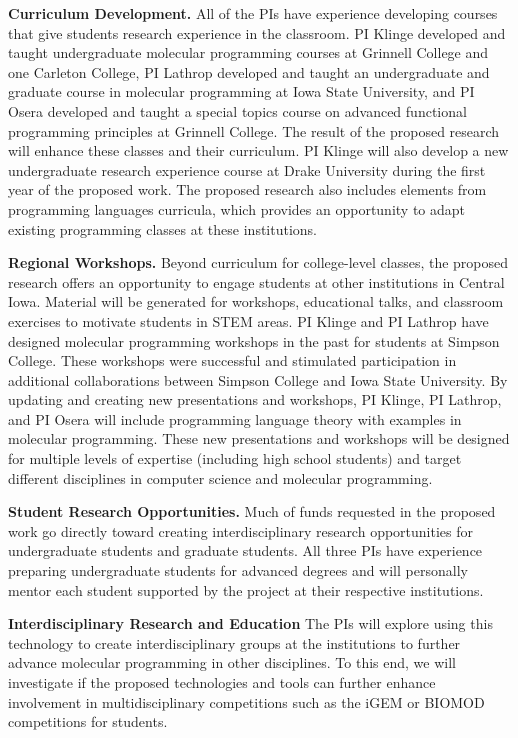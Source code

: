 \textbf{Curriculum Development.}
All of the PIs have experience developing courses that give students research experience in the classroom.
PI Klinge developed and taught undergraduate molecular programming courses at Grinnell College and one Carleton College, PI Lathrop developed and taught an undergraduate and graduate course in molecular programming at Iowa State University, and PI Osera developed and taught a special topics course on advanced functional programming principles at Grinnell College.
The result of the proposed research will enhance these classes and their curriculum.
PI Klinge will also develop a new undergraduate research experience course at Drake University during the first year of the proposed work.
The proposed research also includes elements from programming languages curricula, which provides an opportunity to adapt existing programming classes at these institutions.

\textbf{Regional Workshops.}
Beyond curriculum for college-level classes, the proposed research offers an opportunity to engage students at other institutions in Central Iowa.
Material will be generated for workshops, educational talks, and classroom exercises to  motivate students in STEM areas.
PI Klinge and PI Lathrop have designed molecular programming workshops in the past for students at Simpson College.
These workshops were successful and stimulated participation in additional collaborations between Simpson College and Iowa State University.
By updating and creating new presentations and workshops, PI Klinge, PI Lathrop, and PI Osera will include programming language theory with examples in molecular programming.
These new presentations and workshops will be designed for multiple levels of expertise (including high school students) and target different disciplines in computer science and molecular programming.

\textbf{Student Research Opportunities.}
Much of funds requested in the proposed work go directly toward creating interdisciplinary research opportunities for undergraduate students and graduate students.
All three PIs have experience preparing undergraduate students for advanced degrees and will personally mentor each student supported by the project at their respective institutions.

\textbf{Interdisciplinary Research and Education}
The PIs will explore using this technology to create interdisciplinary groups at the institutions to further advance molecular programming in other disciplines.
To this end, we will investigate if the proposed technologies and tools can further enhance involvement in multidisciplinary competitions such as the iGEM or BIOMOD competitions for students.

